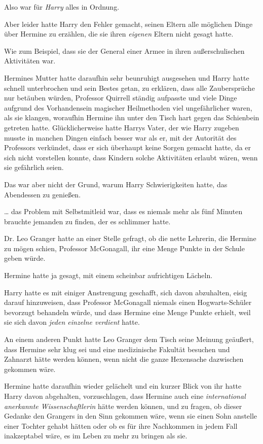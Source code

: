 {Also war für \emph{Harry} alles in Ordnung.

Aber leider hatte Harry den Fehler gemacht, seinen Eltern alle möglichen Dinge über Hermine zu erzählen, die sie ihren \emph{eigenen} Eltern nicht gesagt hatte.

Wie zum Beispiel, dass sie der General einer Armee in ihren außerschulischen Aktivitäten war.

Hermines Mutter hatte daraufhin sehr beunruhigt ausgesehen und Harry hatte schnell unterbrochen und sein Bestes getan, zu erklären, dass alle Zaubersprüche nur betäuben würden, Professor Quirrell ständig aufpasste und viele Dinge aufgrund des Vorhandensein magischer Heilmethoden viel ungefährlicher waren, als sie klangen, woraufhin Hermine ihn unter den Tisch hart gegen das Schienbein getreten hatte. Glücklicherweise hatte Harrys Vater, der wie Harry zugeben musste in manchen Dingen einfach besser war als er, mit der Autorität des Professors verkündet, dass er sich überhaupt keine Sorgen gemacht hatte, da er sich nicht vorstellen konnte, dass Kindern solche Aktivitäten erlaubt wären, wenn sie gefährlich seien.

Das war aber nicht der Grund, warum Harry Schwierigkeiten hatte, das Abendessen zu genießen.

… das Problem mit Selbstmitleid war, dass es niemals mehr als fünf Minuten brauchte jemanden zu finden, der es schlimmer hatte.

Dr. Leo Granger hatte an einer Stelle gefragt, ob die nette Lehrerin, die Hermine zu mögen schien, Professor McGonagall, ihr eine Menge Punkte in der Schule geben würde.

Hermine hatte ja gesagt, mit einem scheinbar aufrichtigen Lächeln.

Harry hatte es mit einiger Anstrengung geschafft, sich davon abzuhalten, eisig darauf hinzuweisen, dass Professor McGonagall niemals einen Hogwarts-Schüler bevorzugt behandeln würde, und dass Hermine eine Menge Punkte erhielt, weil sie sich davon \emph{jeden einzelne verdient} hatte.

An einem anderen Punkt hatte Leo Granger dem Tisch seine Meinung geäußert, dass Hermine sehr klug sei und eine medizinische Fakultät besuchen und Zahnarzt hätte werden können, wenn nicht die ganze Hexensache dazwischen gekommen wäre.

Hermine hatte daraufhin wieder gelächelt und ein kurzer Blick von ihr hatte Harry davon abgehalten, vorzuschlagen, dass Hermine auch eine \emph{international anerkannte Wissenschaftlerin} hätte werden können, und zu fragen, ob dieser Gedanke den Grangers in den Sinn gekommen wäre, wenn sie einen Sohn anstelle einer Tochter gehabt hätten oder ob es für ihre Nachkommen in jedem Fall inakzeptabel wäre, es im Leben zu mehr zu bringen als sie.

}
